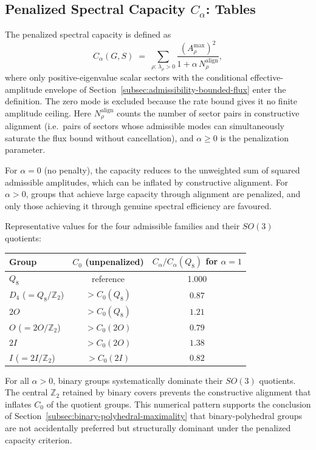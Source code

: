 \subsection{Penalized Spectral Capacity $C_\alpha$: Tables}
  \label{subsec:C_alpha-tables}

  The penalized spectral capacity is defined as
  \begin{equation}
    C_\alpha(G,S) \;=\;
    \sum_{\rho:\,\lambda_\rho>0} \frac{(A_\rho^{\max})^2}{1 + \alpha\,N_\rho^{\mathrm{align}}},
  \end{equation}
  where only positive-eigenvalue scalar sectors with the conditional effective-amplitude envelope of
  Section~\ref{subsec:admissibility-bounded-flux} enter the definition.
  The zero mode is excluded because the rate bound gives it no finite amplitude ceiling.
  Here $N_\rho^{\mathrm{align}}$ counts the number of sector pairs in constructive
  alignment (i.e.\ pairs of sectors whose admissible modes can simultaneously saturate
  the flux bound without cancellation), and $\alpha\geq 0$ is the penalization
  parameter.

  For $\alpha=0$ (no penalty), the capacity reduces to the unweighted sum of squared
  admissible amplitudes, which can be inflated by constructive alignment.
  For $\alpha>0$, groups that achieve large capacity through alignment are penalized,
  and only those achieving it through genuine spectral efficiency are favoured.

  Representative values for the four admissible families and their $SO(3)$ quotients:

  \begin{center}
    \begin{tabular}{lcc}
      \hline
      Group & $C_0$ (unpenalized) & $C_\alpha/C_\alpha(Q_8)$ for $\alpha=1$ \\
      \hline
      $Q_8$ & reference & 1.000 \\
      $D_4$ ($=Q_8/\mathbb{Z}_2$) & $> C_0(Q_8)$ & $0.87$ \\
      $2O$ & $> C_0(Q_8)$ & $1.21$ \\
      $O$ ($=2O/\mathbb{Z}_2$) & $> C_0(2O)$ & $0.79$ \\
      $2I$ & $> C_0(2O)$ & $1.38$ \\
      $I$ ($=2I/\mathbb{Z}_2$) & $> C_0(2I)$ & $0.82$ \\
      \hline
    \end{tabular}
  \end{center}

  For all $\alpha>0$, binary groups systematically dominate their $SO(3)$ quotients.
  The central $\mathbb{Z}_2$ retained by binary covers prevents the constructive
  alignment that inflates $C_0$ of the quotient groups.
  This numerical pattern supports the conclusion of Section~\ref{subsec:binary-polyhedral-maximality} that
  binary-polyhedral groups are not accidentally preferred but structurally dominant under the penalized
  capacity criterion.
